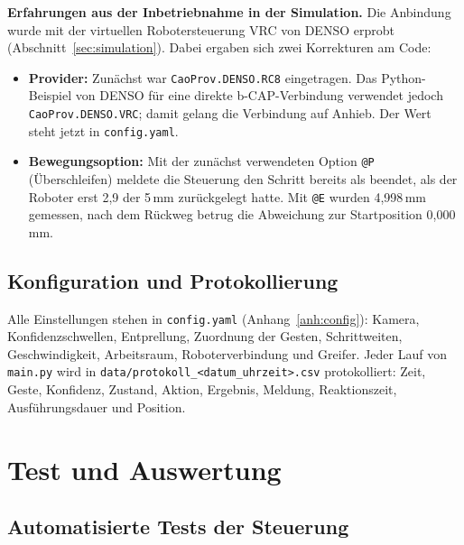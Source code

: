 \documentclass[11pt,a4paper]{article}
\newcommand{\datei}[1]{\texttt{#1}}
\begin{document}
\textbf{Erfahrungen aus der Inbetriebnahme in der Simulation.} Die Anbindung wurde mit der
virtuellen Robotersteuerung VRC von DENSO erprobt
(Abschnitt~\ref{sec:simulation}). Dabei ergaben sich zwei Korrekturen am Code:
\begin{itemize}
  \item \textbf{Provider:} Zunächst war \texttt{CaoProv.DENSO.RC8} eingetragen. Das Python-Beispiel
        von DENSO für eine direkte b-CAP-Verbindung verwendet jedoch \texttt{CaoProv.DENSO.VRC};
        damit gelang die Verbindung auf Anhieb. Der Wert steht jetzt in \datei{config.yaml}.
  \item \textbf{Bewegungsoption:} Mit der zunächst verwendeten Option \texttt{@P} (Überschleifen)
        meldete die Steuerung den Schritt bereits als beendet, als der Roboter erst 2,9 der 5\,mm
        zurückgelegt hatte. Mit \texttt{@E} wurden 4,998\,mm gemessen, nach dem Rückweg betrug die
        Abweichung zur Startposition 0,000\,mm.
\end{itemize}

\subsection{Konfiguration und Protokollierung}

Alle Einstellungen stehen in \datei{config.yaml} (Anhang~\ref{anh:config}): Kamera,
Konfidenzschwellen, Entprellung, Zuordnung der Gesten, Schrittweiten, Geschwindigkeit,
Arbeitsraum, Roboterverbindung und Greifer. Jeder Lauf von \datei{main.py} wird in
\datei{data/protokoll\_<datum\_uhrzeit>.csv} protokolliert: Zeit, Geste, Konfidenz, Zustand, Aktion,
Ergebnis, Meldung, Reaktionszeit, Ausführungsdauer und Position.

\section{Test und Auswertung}

\subsection{Automatisierte Tests der Steuerung}
\end{document}
